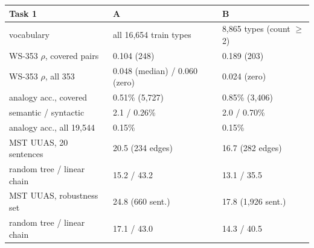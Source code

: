 \begin{tabular}{lll}
\toprule
Task 1 & A & B \\
\midrule
vocabulary & all 16,654 train types & 8,865 types (count $\ge$2) \\
WS-353 $\rho$, covered pairs & 0.104 (248) & 0.189 (203) \\
WS-353 $\rho$, all 353 & 0.048 (median) / 0.060 (zero) & 0.024 (zero) \\
analogy acc., covered & 0.51\% (5,727) & 0.85\% (3,406) \\
\quad semantic / syntactic & 2.1 / 0.26\% & 2.0 / 0.70\% \\
analogy acc., all 19,544 & 0.15\% & 0.15\% \\
MST UUAS, 20 sentences & 20.5 (234 edges) & 16.7 (282 edges) \\
\quad random tree / linear chain & 15.2 / 43.2 & 13.1 / 35.5 \\
MST UUAS, robustness set & 24.8 (660 sent.) & 17.8 (1,926 sent.) \\
\quad random tree / linear chain & 17.1 / 43.0 & 14.3 / 40.5 \\
\bottomrule
\end{tabular}
